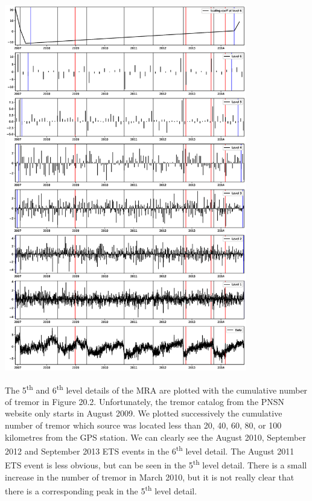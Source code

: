 \documentclass[main.tex]{subfiles}
\begin{document}
\begin{center}
\includegraphics[width=300pt, trim={3.5cm 6cm 3.5cm 6.5cm},clip]{Figures/slowslip_results/Figure_1.eps}
\captionsetup{type=figure}
\end{center}

The 5\textsuperscript{th} and 6\textsuperscript{th} level details of the MRA are plotted with the cumulative number of tremor in Figure 20.2. Unfortunately, the tremor catalog from the PNSN website only starts in August 2009. We plotted successively the cumulative number of tremor which source was located less than 20, 40, 60, 80, or 100 kilometres from the GPS station. We can clearly see the August 2010, September 2012 and September 2013 ETS events in the 6\textsuperscript{th} level detail. The August 2011 ETS event is less obvious, but can be seen in the 5\textsuperscript{th} level detail. There is a small increase in the number of tremor in March 2010, but it is not really clear that there is a corresponding peak in the 5\textsuperscript{th} level detail.
\end{document}

